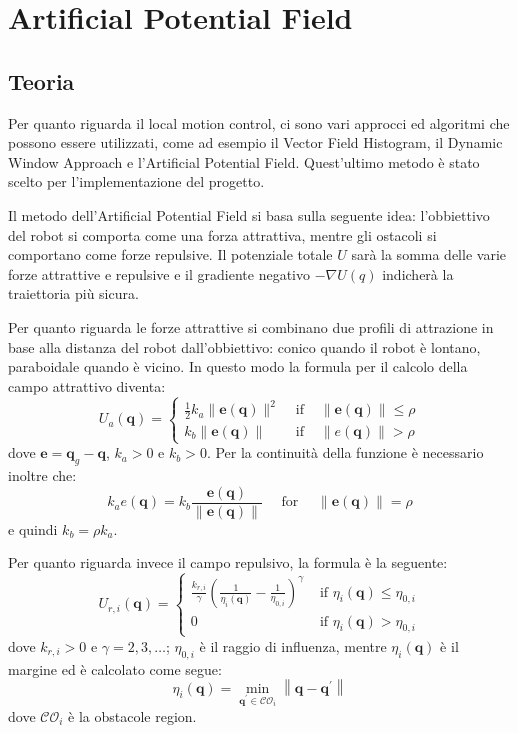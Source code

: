 \documentclass[Lau, binding=0.6cm, oneside]{sapthesis}
\begin{document}
\section{Artificial Potential Field}
\subsection{Teoria}
Per quanto riguarda il local motion control, ci sono vari approcci ed algoritmi che possono essere utilizzati, come ad esempio il Vector Field Histogram, il Dynamic Window Approach e l'Artificial Potential Field\cite{fonte1}.
Quest'ultimo metodo è stato scelto per l'implementazione del progetto.

Il metodo dell'Artificial Potential Field si basa sulla seguente idea: l'obbiettivo del robot si comporta come una forza attrattiva, mentre gli ostacoli si comportano come forze repulsive.
Il potenziale totale $U$ sarà la somma delle varie forze attrattive e repulsive e il gradiente negativo $-\nabla U(q)$ indicherà la traiettoria più sicura.

Per quanto riguarda le forze attrattive si combinano due profili di attrazione in base alla distanza del robot dall'obbiettivo: conico quando il robot è lontano, paraboidale quando è vicino.
In questo modo la formula per il calcolo della campo attrattivo diventa:
\newline
$$
U_{a}(\boldsymbol{q})=\left\{\begin{array}{cll}
\frac{1}{2} k_{a}\|\boldsymbol{e}(\boldsymbol{q})\|^{2} & \text { if } & \|\boldsymbol{e}(\boldsymbol{q})\| \leq \rho \\
k_{b}\|\boldsymbol{e}(\boldsymbol{q})\| & \text { if } & \|e(\boldsymbol{q})\|>\rho
\end{array}\right.
$$
\newline
dove $\boldsymbol{e}=\boldsymbol{q}_{g}-\boldsymbol{q}$, $k_{a}>0$ e $k_{b}>0$.
Per la continuità della funzione è necessario inoltre che:
$$
k_{a} e(\boldsymbol{q})=k_{b} \frac{\boldsymbol{e}(\boldsymbol{q})}{\|\boldsymbol{e}(\boldsymbol{q})\|} \quad \text { for } \quad\|\boldsymbol{e}(\boldsymbol{q})\|=\rho
$$
\newline
e quindi $k_{b}=\rho k_{a}$.

Per quanto riguarda invece il campo repulsivo, la formula è la seguente:
\newline
$$
U_{r, i}(\boldsymbol{q})=\left\{\begin{array}{ll}
\frac{k_{r, i}}{\gamma}\left(\frac{1}{\eta_{i}(\boldsymbol{q})}-\frac{1}{\eta_{0, i}}\right)^{\gamma} & \text { if } \eta_{i}(\boldsymbol{q}) \leq \eta_{0, i} \\
0 & \text { if } \eta_{i}(\boldsymbol{q})>\eta_{0, i}
\end{array}\right.
$$
\newline
dove $k_{r, i}>0$ e $\gamma=2,3, \ldots$; $\eta_{0, i}$ è il raggio di influenza, mentre $\eta_{i}(\boldsymbol{q})$ è il margine ed è calcolato come segue:
$$
\eta_{i}(\boldsymbol{q})=\min _{\boldsymbol{q}^{\prime} \in \mathcal{C O}_{i}}\left\|\boldsymbol{q}-\boldsymbol{q}^{\prime}\right\|
$$
\newline
dove $\mathcal{C O}_{i}$ è la obstacole region.
\end{document}

